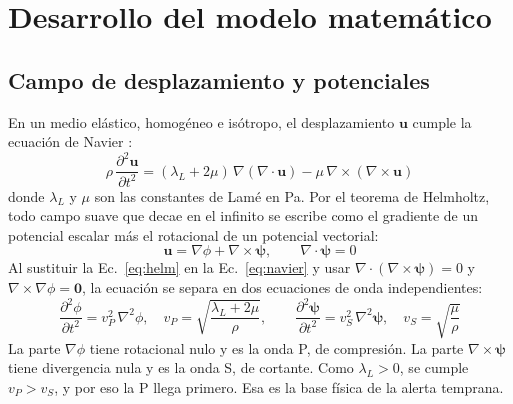 \documentclass[11pt,letterpaper]{article}
\begin{document}
\section{Desarrollo del modelo matemático}
\subsection{Campo de desplazamiento y potenciales}
En un medio elástico, homogéneo e isótropo, el desplazamiento $\mathbf{u}$ cumple la ecuación de Navier \parencite{shearer2019}:
\begin{equation}
\rho\,\frac{\partial^2\mathbf{u}}{\partial t^2} = (\lambda_L + 2\mu)\,\nabla(\nabla\cdot\mathbf{u}) - \mu\,\nabla\times(\nabla\times\mathbf{u})
\label{eq:navier}
\end{equation}
donde $\lambda_L$ y $\mu$ son las constantes de Lamé en \si{Pa}. Por el teorema de Helmholtz, todo campo suave que decae en el infinito se escribe como el gradiente de un potencial escalar más el rotacional de un potencial vectorial:
\begin{equation}
\mathbf{u} = \nabla\phi + \nabla\times\boldsymbol{\psi}, \qquad \nabla\cdot\boldsymbol{\psi} = 0
\label{eq:helm}
\end{equation}
Al sustituir la Ec.~\eqref{eq:helm} en la Ec.~\eqref{eq:navier} y usar $\nabla\cdot(\nabla\times\boldsymbol\psi) = 0$ y $\nabla\times\nabla\phi = \mathbf{0}$, la ecuación se separa en dos ecuaciones de onda independientes:
\begin{equation}
\frac{\partial^2\phi}{\partial t^2} = v_P^2\,\nabla^2\phi, \quad v_P = \sqrt{\frac{\lambda_L + 2\mu}{\rho}}, \qquad
\frac{\partial^2\boldsymbol\psi}{\partial t^2} = v_S^2\,\nabla^2\boldsymbol\psi, \quad v_S = \sqrt{\frac{\mu}{\rho}}
\label{eq:PS}
\end{equation}
La parte $\nabla\phi$ tiene rotacional nulo y es la onda P, de compresión. La parte $\nabla\times\boldsymbol\psi$ tiene divergencia nula y es la onda S, de cortante. Como $\lambda_L > 0$, se cumple $v_P > v_S$, y por eso la P llega primero. Esa es la base física de la alerta temprana.
\end{document}
